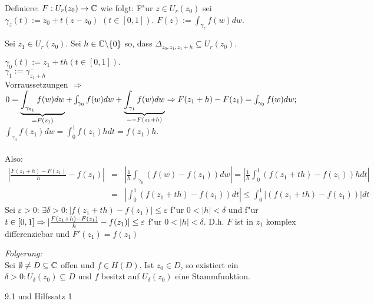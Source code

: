 \documentclass[a4paper,twoside,DIV15,BCOR12mm]{scrbook}
\begin{document}
\begin{beweis}
Definiere: $F: U_r(z_0) \rightarrow \mathbb{C}$ wie folgt:
F"ur $z \in U_r(z_0)$ sei $\gamma_z(t) := z_0 + t(z-z_0) $ $(t \in [0,1]). $ $ F(z) := \int_{\gamma_z} f(w)dw$.

Sei $z_1 \in U_r(z_0)$. Sei $h \in \mathbb{C} \backslash\{0\}$ so, dass $\Delta_{z_0,z_1,z_1+h} \subseteq U_r(z_0)$.

$\gamma_0(t) := z_1 + th (t \in [0,1]).$\\
$\gamma_1 := \gamma_{z_1+h}^-$\\
Vorraussetzungen   $\Rightarrow$ $ 0 = \underbrace{\int_{\gamma_{z_1}}f(w)dw}_{=F(z_1)} +
\int_{\gamma_0} f(w)dw + \underbrace{\int_{\gamma_1}f(w)dw}_{=-F(z_1+h)} \Rightarrow F(z_1+h) - F(z_1) \\ 
= \int_{\gamma_0} f(w)dw;$\\
$\int_{\gamma_0}f(z_1)dw = \int_0^1 f(z_1)hdt = f(z_1)h.$\\ \\
Also:
\begin{eqnarray}\nonumber
\left| \frac{F(z_1+h) - F(z_1)}h - f(z_1) \right|&=&\left| \frac1h \int_{\gamma_0}
(f(w)-f(z_1))dw \right| = \left| \frac1h \int_0^1(f(z_1+th)-f(z_1))h dt \right|\\\nonumber 
&=& \left| \int_0^1(f(z_1+th) - f(z_1))dt \right| \leq \int_0^1 \left|(f(z_1+th) - f(z_1))\right| dt
\end{eqnarray}
Sei $\varepsilon > 0: \,\exists \delta > 0: |f(z_1+th) - f(z_1)| \leq \varepsilon$ f"ur $0 < |h| < \delta$ und f"ur $t \in [0,1] \Rightarrow \\ | \frac{F(z_1+h) - F(z_1)}h - f(z_1)| \leq \varepsilon$ f"ur $0 < |h| < \delta$. D.h. $F$ ist in $z_1$ komplex differenziebar und $F'(z_1) = f(z_1)$
\end{beweis}



\emph{Folgerung:}\\
Sei $\emptyset \not= D \subseteq \mathbb{C}$ offen und $f \in H(D)$. Ist $z_0 \in D$, so existiert ein $\delta > 0: U_{\delta}(z_0) \subseteq D$ und $f$ besitzt auf $U_{\delta}(z_0)$ eine Stammfunktion.\\

\begin{beweis}
9.1 und Hilfssatz 1
\end{beweis}


\end{document}
